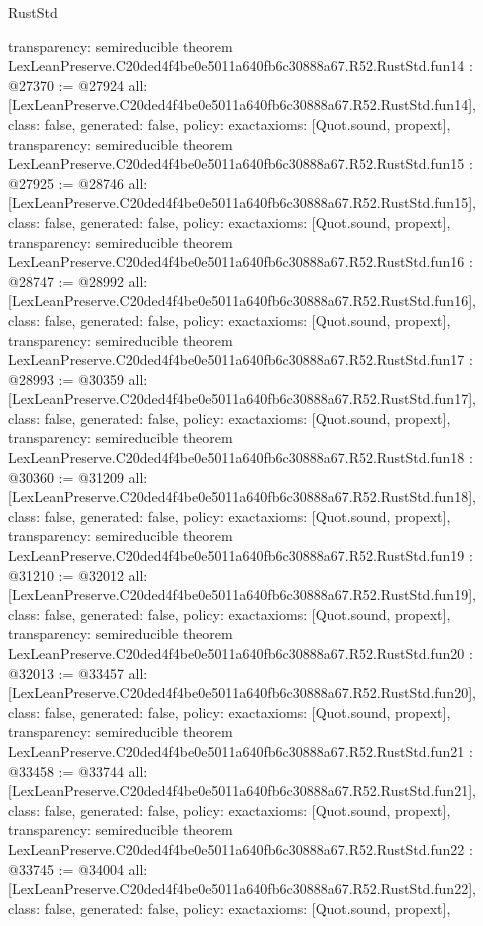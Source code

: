 \begin{lexlean}{RustStd}
\begin{coremodule}
{  transparency: semireducible
}
theorem LexLeanPreserve.C20ded4f4be0e5011a640fb6c30888a67.R52.RustStd.fun14 : @27370 := @27924 {
  all: [LexLeanPreserve.C20ded4f4be0e5011a640fb6c30888a67.R52.RustStd.fun14],
  class: false,
  generated: false,
  policy: exact{axioms: [Quot.sound, propext]},
  transparency: semireducible
}
theorem LexLeanPreserve.C20ded4f4be0e5011a640fb6c30888a67.R52.RustStd.fun15 : @27925 := @28746 {
  all: [LexLeanPreserve.C20ded4f4be0e5011a640fb6c30888a67.R52.RustStd.fun15],
  class: false,
  generated: false,
  policy: exact{axioms: [Quot.sound, propext]},
  transparency: semireducible
}
theorem LexLeanPreserve.C20ded4f4be0e5011a640fb6c30888a67.R52.RustStd.fun16 : @28747 := @28992 {
  all: [LexLeanPreserve.C20ded4f4be0e5011a640fb6c30888a67.R52.RustStd.fun16],
  class: false,
  generated: false,
  policy: exact{axioms: [Quot.sound, propext]},
  transparency: semireducible
}
theorem LexLeanPreserve.C20ded4f4be0e5011a640fb6c30888a67.R52.RustStd.fun17 : @28993 := @30359 {
  all: [LexLeanPreserve.C20ded4f4be0e5011a640fb6c30888a67.R52.RustStd.fun17],
  class: false,
  generated: false,
  policy: exact{axioms: [Quot.sound, propext]},
  transparency: semireducible
}
theorem LexLeanPreserve.C20ded4f4be0e5011a640fb6c30888a67.R52.RustStd.fun18 : @30360 := @31209 {
  all: [LexLeanPreserve.C20ded4f4be0e5011a640fb6c30888a67.R52.RustStd.fun18],
  class: false,
  generated: false,
  policy: exact{axioms: [Quot.sound, propext]},
  transparency: semireducible
}
theorem LexLeanPreserve.C20ded4f4be0e5011a640fb6c30888a67.R52.RustStd.fun19 : @31210 := @32012 {
  all: [LexLeanPreserve.C20ded4f4be0e5011a640fb6c30888a67.R52.RustStd.fun19],
  class: false,
  generated: false,
  policy: exact{axioms: [Quot.sound, propext]},
  transparency: semireducible
}
theorem LexLeanPreserve.C20ded4f4be0e5011a640fb6c30888a67.R52.RustStd.fun20 : @32013 := @33457 {
  all: [LexLeanPreserve.C20ded4f4be0e5011a640fb6c30888a67.R52.RustStd.fun20],
  class: false,
  generated: false,
  policy: exact{axioms: [Quot.sound, propext]},
  transparency: semireducible
}
theorem LexLeanPreserve.C20ded4f4be0e5011a640fb6c30888a67.R52.RustStd.fun21 : @33458 := @33744 {
  all: [LexLeanPreserve.C20ded4f4be0e5011a640fb6c30888a67.R52.RustStd.fun21],
  class: false,
  generated: false,
  policy: exact{axioms: [Quot.sound, propext]},
  transparency: semireducible
}
theorem LexLeanPreserve.C20ded4f4be0e5011a640fb6c30888a67.R52.RustStd.fun22 : @33745 := @34004 {
  all: [LexLeanPreserve.C20ded4f4be0e5011a640fb6c30888a67.R52.RustStd.fun22],
  class: false,
  generated: false,
  policy: exact{axioms: [Quot.sound, propext]},
}
\end{coremodule}
\end{lexlean}
